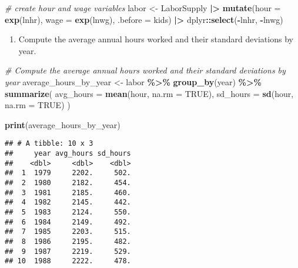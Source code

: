 \documentclass[
]{article}
\newenvironment{Shaded}{\begin{snugshade}}{\end{snugshade}}
\newcommand{\AttributeTok}[1]{\textcolor[rgb]{0.13,0.29,0.53}{#1}}
\newcommand{\CommentTok}[1]{\textcolor[rgb]{0.56,0.35,0.01}{\textit{#1}}}
\newcommand{\ConstantTok}[1]{\textcolor[rgb]{0.56,0.35,0.01}{#1}}
\newcommand{\FunctionTok}[1]{\textcolor[rgb]{0.13,0.29,0.53}{\textbf{#1}}}
\newcommand{\NormalTok}[1]{#1}
\newcommand{\OtherTok}[1]{\textcolor[rgb]{0.56,0.35,0.01}{#1}}
\newcommand{\SpecialCharTok}[1]{\textcolor[rgb]{0.81,0.36,0.00}{\textbf{#1}}}
\providecommand{\tightlist}{%
  \setlength{\itemsep}{0pt}\setlength{\parskip}{0pt}}
\begin{document}
\begin{Shaded}
\begin{Highlighting}[]
\CommentTok{\# create hour and wage variables}
\NormalTok{labor }\OtherTok{\textless{}{-}}\NormalTok{ LaborSupply }\SpecialCharTok{|\textgreater{}} 
  \FunctionTok{mutate}\NormalTok{(}\AttributeTok{hour =} \FunctionTok{exp}\NormalTok{(lnhr), }\AttributeTok{wage =} \FunctionTok{exp}\NormalTok{(lnwg), }\AttributeTok{.before =}\NormalTok{ kids) }\SpecialCharTok{|\textgreater{}} 
\NormalTok{  dplyr}\SpecialCharTok{::}\FunctionTok{select}\NormalTok{(}\SpecialCharTok{{-}}\NormalTok{lnhr, }\SpecialCharTok{{-}}\NormalTok{lnwg)}
\end{Highlighting}
\end{Shaded}

\begin{enumerate}
\def\labelenumi{\alph{enumi}.}
\tightlist
\item
  Compute the average annual hours worked and their standard deviations
  by year.
\end{enumerate}

\begin{Shaded}
\begin{Highlighting}[]
\CommentTok{\# Compute the average annual hours worked and their standard deviations by year}
\NormalTok{average\_hours\_by\_year }\OtherTok{\textless{}{-}}\NormalTok{ labor }\SpecialCharTok{\%\textgreater{}\%}
  \FunctionTok{group\_by}\NormalTok{(year) }\SpecialCharTok{\%\textgreater{}\%}
  \FunctionTok{summarize}\NormalTok{(}
    \AttributeTok{avg\_hours =} \FunctionTok{mean}\NormalTok{(hour, }\AttributeTok{na.rm =} \ConstantTok{TRUE}\NormalTok{),}
    \AttributeTok{sd\_hours =} \FunctionTok{sd}\NormalTok{(hour, }\AttributeTok{na.rm =} \ConstantTok{TRUE}\NormalTok{)}
\NormalTok{  )}

\FunctionTok{print}\NormalTok{(average\_hours\_by\_year)}
\end{Highlighting}
\end{Shaded}

\begin{verbatim}
## # A tibble: 10 x 3
##     year avg_hours sd_hours
##    <dbl>     <dbl>    <dbl>
##  1  1979     2202.     502.
##  2  1980     2182.     454.
##  3  1981     2185.     460.
##  4  1982     2145.     442.
##  5  1983     2124.     550.
##  6  1984     2149.     492.
##  7  1985     2203.     515.
##  8  1986     2195.     482.
##  9  1987     2219.     529.
## 10  1988     2222.     478.
\end{verbatim}
\end{document}
